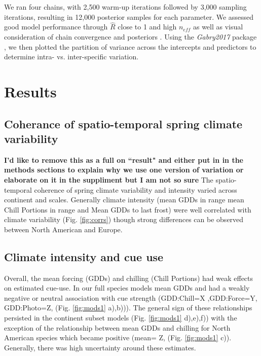 \documentclass[12pt]{article}\usepackage[]{graphicx}\usepackage[]{color}
\begin{document}
We ran four chains, with 2,500 warm-up iterations followed by 3,000 sampling iterations, resulting in 12,000 posterior samples for each parameter. We assessed good model performance through $\hat{R}$ close to 1 and high $n_{eff}$ as well as visual consideration of chain convergence and posteriors \citep{Gelman2006}. Using the \textit{Gabry2017} package \citep{bayesplot}, we then plotted the partition of variance across the intercepts and predictors to determine intra- vs. inter-specific variation.  



\section*{Results}

\subsection*{Coherance of spatio-temporal spring climate variability}
\textbf{I'd like to remove this as a full on ``result" and either put in in the methods sections to explain why we use one version of variation or elaborate on it in the suppliment but I am not so sure}
The spatio-temporal coherence of spring climate variability and intensity varied across continent and scales. Generally climate intensity (mean GDDs in range mean Chill Portions in range and Mean GDDs to last frost) were well correlated with climate variability (Fig. \ref{fig:corrs}) though strong differences can be observed between North American and Europe.  %

\subsection*{Climate intensity and cue use}
Overall, the mean forcing (GDDs) and chilling (Chill Portions) had weak effects on estimated cue-use. 
In our full species models mean GDDs and had a weakly negative or neutral association with cue strength (GDD:Chill=X ,GDD:Force=Y, GDD:Photo=Z, (Fig. \ref{fig:mods1} a),b))). The general sign of these relationships persisted in the continent subset models (Fig. \ref{fig:mods1} d),e),f)) with the exception of the relationship between mean GDDs and chilling for North American species which became positive (mean= Z, (Fig. \ref{fig:mods1} c)). Generally, there was high uncertainty around these estimates.%
\end{document}
